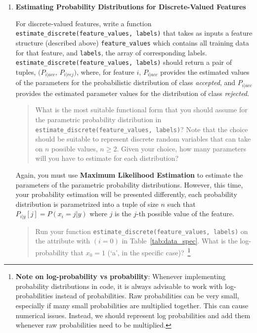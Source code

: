 \begin{enumerate}
    \item \textbf{Estimating Probability Distributions for Discrete-Valued Features} 
    
     For discrete-valued features, write a function \texttt{estimate\_discrete(feature\_values, labels)} that takes as inputs a feature structure (described above) \texttt{feature\_values} which contains all training data for that feature, and \texttt{labels}, the array of corresponding labels. \texttt{estimate\_discrete(feature\_values, labels)} should return a pair of tuples, $(P_{i|acc}$, $P_{i|rej})$, where, for feature $i$, $P_{i|acc}$ provides the estimated values of the parameters for the probabilistic distribution of class {\em accepted}, and $P_{i|acc}$ provides the estimated parameter values for the distribution of class {\em rejected}.
     
    \begin{quote}
        
     What is the most suitable functional form that you should assume for the parametric probability distribution in \texttt{estimate\_discrete(feature\_values, labels)}? Note that the choice should be suitable to represent discrete random variables that can take on $n$ possible values, $n \ge 2$. Given your choice, how many parameters will you have to estimate for each distribution?
    
    \begin{tcolorbox}[fit,height=4cm, width=0.8\textwidth, blank,     borderline={1pt}{-2pt},nobeforeafter]
    \end{tcolorbox}
    \end{quote}
    
    Again, you must use \textbf{Maximum Likelihood Estimation} to estimate the parameters of the parametric probability distributions. However, this time, your probability estimation will be presented differently, each probability distribution is parametrized into a tuple of size $n$ such that $P_{i|y}[j] = P(x_i = j | y)$ where $j$ is the $j$-th possible value of the feature. 
    
    \begin{quote}
     Run your function \texttt{estimate\_discrete(feature\_values, labels)} on the attribute with $(i = 0)$ in Table~\ref{tab:data_spec}. What is the log-probability that $x_{0} = 1$ (`a', in the specific case)?~\footnote{\textbf{Note on log-probability vs probability}: Whenever implementing probability distributions in code, it is always advisable to work with log-probabilities instead of probabilities. Raw probabilities can be very small, especially if many small probabilities are multiplied together. This can cause numerical issues. Instead, we should represent log probabilities and add them whenever raw probabilities need to be multiplied.}
    

\end{quote}
\end{enumerate}
